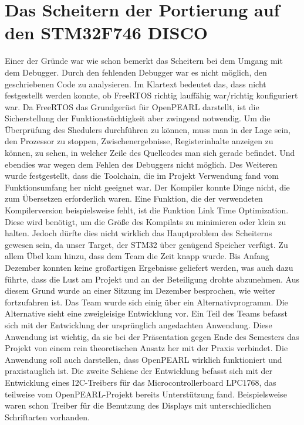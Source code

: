 \section{Das Scheitern der Portierung auf den STM32F746 DISCO}
Einer der Gründe war wie schon bemerkt das Scheitern bei dem Umgang mit dem Debugger. Durch den fehlenden Debugger war es nicht möglich, den geschriebenen Code zu analysieren. Im Klartext bedeutet das, dass nicht festgestellt werden konnte, ob FreeRTOS richtig lauffähig war/richtig konfiguriert war. Da FreeRTOS das Grundgerüst für OpenPEARL darstellt, ist die Sicherstellung der Funktionstüchtigkeit aber zwingend notwendig. Um die Überprüfung des Shedulers durchführen zu können, muss man in der Lage sein, den Prozessor zu stoppen, Zwischenergebnisse, Registerinhalte anzeigen zu können, zu sehen, in welcher Zeile des Quellcodes man sich gerade befindet. Und ebendies war wegen dem Fehlen des Debuggers nicht möglich. 
Des Weiteren wurde festgestellt, dass die Toolchain, die im Projekt Verwendung fand vom Funktionsumfang her nicht geeignet war. 
Der Kompiler konnte Dinge nicht, die zum Übersetzen erforderlich waren. Eine Funktion, die der verwendeten Kompilerversion beispielsweise fehlt, ist die Funktion Link Time Optimization. Diese wird benötigt, um die Größe des Kompilats zu minimieren oder klein zu halten. Jedoch dürfte dies nicht wirklich das Hauptproblem des Scheiterns gewesen sein, da unser Target, der STM32 über genügend Speicher verfügt. 
Zu allem Übel kam hinzu, dass dem Team die Zeit knapp wurde. Bis Anfang Dezember konnten keine großartigen Ergebnisse geliefert werden, was auch dazu führte, dass die Lust am Projekt und an der Beteiligung drohte abzunehmen. 
Aus diesem Grund wurde an einer Sitzung im Dezember besprochen, wie weiter fortzufahren ist. Das Team wurde sich einig über ein Alternativprogramm.
Die Alternative sieht eine zweigleisige Entwicklung vor. Ein Teil des Teams befasst sich mit der Entwicklung der ursprünglich angedachten Anwendung. Diese Anwendung ist wichtig, da sie bei der Präsentation gegen Ende des Semesters das Projekt von einem rein theoretischen Ansatz her mit der Praxis verbindet. Die Anwendung soll auch darstellen, dass OpenPEARL wirklich funktioniert und praxistauglich ist. Die zweite Schiene der Entwicklung befasst sich mit der Entwicklung eines I2C-Treibers für das Microcontrollerboard LPC1768, das teilweise vom OpenPEARL-Projekt bereits Unterstützung fand. Beispielsweise waren schon Treiber für die Benutzung des Displays mit unterschiedlichen Schriftarten vorhanden.
